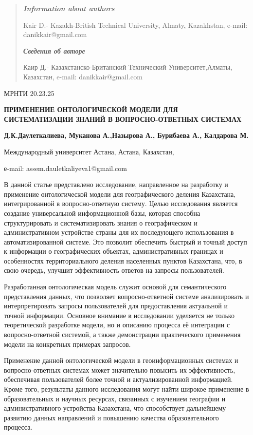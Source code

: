 \begin{quote}
\emph{\textbf{Information about authors}}

Kair D.- Kazakh-British Technical University, Almaty, Kazakhstan,
e-mail: danikkair@gmail.com

\emph{\textbf{Сведения об авторе}}

\emph{\textbf{\hfill\break
}}Каир Д.- Казахстанско-Британский Технический Университет,Алматы,
Казахстан, e-mail: danikkair@gmail.com
\end{quote}

МРНТИ 20.23.25

\textbf{ПРИМЕНЕНИЕ ОНТОЛОГИЧЕСКОЙ МОДЕЛИ ДЛЯ СИСТЕМАТИЗАЦИИ ЗНАНИЙ В
ВОПРОСНО-ОТВЕТНЫХ СИСТЕМАХ}

\textbf{Д.К.Даулеткалиева, Муканова А.,Назырова А., Бурибаева А.,
Калдарова М.}

Международный университет Астана, Астана, Казахстан,

е-mail: assem.dauletkaliyeva1@gmail.com

В данной статье представлено исследование, направленное на разработку и
применение онтологической модели для географического деления Казахстана,
интегрированной в вопросно-ответную систему. Целью исследования является
создание универсальной информационной базы, которая способна
структурировать и систематизировать знания о географическом и
административном устройстве страны для их последующего использования в
автоматизированной системе. Это позволит обеспечить быстрый и точный
доступ к информации о географических объектах, административных границах
и особенностях территориального деления населенных пунктов Казахстана,
что, в свою очередь, улучшит эффективность ответов на запросы
пользователей.

Разработанная онтологическая модель служит основой для семантического
представления данных, что позволяет вопросно-ответной системе
анализировать и интерпретировать запросы пользователей для
предоставления актуальной и точной информации. Основное внимание в
исследовании уделяется не только теоретической разработке модели, но и
описанию процесса её интеграции с вопросно-ответной системой, а также
демонстрации практического применения модели на конкретных примерах
запросов.

Применение данной онтологической модели в геоинформационных системах и
вопросно-ответных системах может значительно повысить их эффективность,
обеспечивая пользователей более точной и актуализированной информацией.
Кроме того, результаты данного исследования могут найти широкое
применение в образовательных и научных ресурсах, связанных с изучением
географии и административного устройства Казахстана, что способствует
дальнейшему развитию данных направлений и повышению качества
образовательного процесса.

